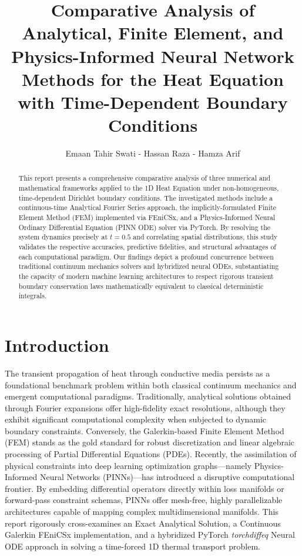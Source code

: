 \documentclass[journal]{IEEEtran}
\begin{document}
\title{Comparative Analysis of Analytical, Finite Element, and Physics-Informed Neural Network Methods for the Heat Equation with Time-Dependent Boundary Conditions}
\author{Emaan Tahir Swati - Hassan Raza - Hamza Arif}

\maketitle

\begin{abstract}
This report presents a comprehensive comparative analysis of three numerical and mathematical frameworks applied to the 1D Heat Equation under non-homogeneous, time-dependent Dirichlet boundary conditions. The investigated methods include a continuous-time Analytical Fourier Series approach, the implicitly-formulated Finite Element Method (FEM) implemented via FEniCSx, and a Physics-Informed Neural Ordinary Differential Equation (PINN ODE) solver via PyTorch. 
By resolving the system dynamics precisely at $t=0.5$ and correlating spatial distributions, this study validates the respective accuracies, predictive fidelities, and structural advantages of each computational paradigm. 
Our findings depict a profound concurrence between traditional continuum mechanics solvers and hybridized neural ODEs, substantiating the capacity of modern machine learning architectures to respect rigorous transient boundary conservation laws mathematically equivalent to classical deterministic integrals.
\end{abstract}

\section{Introduction}
The transient propagation of heat through conductive media persists as a foundational benchmark problem within both classical continuum mechanics and emergent computational paradigms. Traditionally, analytical solutions obtained through Fourier expansions offer high-fidelity exact resolutions, although they exhibit significant computational complexity when subjected to dynamic boundary constraints. Conversely, the Galerkin-based Finite Element Method (FEM) stands as the gold standard for robust discretization and linear algebraic processing of Partial Differential Equations (PDEs).
Recently, the assimilation of physical constraints into deep learning optimization graphs---namely Physics-Informed Neural Networks (PINNs)---has introduced a disruptive computational frontier. By embedding differential operators directly within loss manifolds or forward-pass constraint schemas, PINNs offer mesh-free, highly parallelizable architectures capable of mapping complex multidimensional manifolds. 
This report rigorously cross-examines an Exact Analytical Solution, a Continuous Galerkin FEniCSx implementation, and a hybridized PyTorch \textit{torchdiffeq} Neural ODE approach in solving a time-forced 1D thermal transport problem.
\end{document}
